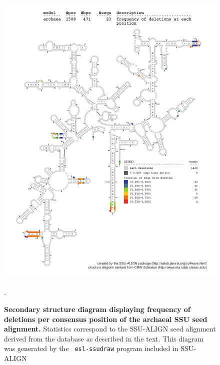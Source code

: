 \begin{figure}
\begin{center}
\includegraphics[width=5.7in]{Figures/archaea-0p1-dall}
\end{center}
\caption[Secondary structure diagram displaying frequency of deletions
  per consensus position of the archaeal SSU seed
  alignment]{\textbf{Secondary structure diagram displaying frequency 
  of deletions per consensus position of the archaeal SSU seed
  alignment.} Statistics correspond to the SSU-ALIGN seed
  alignment derived from the  database \cite{CannoneGutell02}
  as described in the text. This diagram was generated by the {\tt
  esl-ssudraw} program included in SSU-ALIGN}.
\label{fig:arcdel}
\end{figure}


